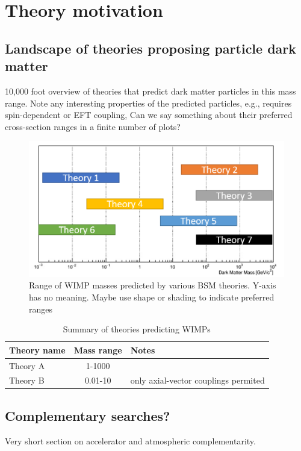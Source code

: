 \section{Theory motivation}
\label{sec:theory}

\subsection{Landscape of theories proposing particle dark matter}
10,000 foot overview of theories that predict dark matter particles in this mass range. Note any interesting properties of the predicted particles, e.g., requires spin-dependent or EFT coupling, Can we say something about their preferred cross-section ranges in a finite number of plots?

\begin{figure}
    \centering
    \includegraphics{figures/theory_landscape_cartoon.png}
    \caption{Range of WIMP masses predicted by various BSM theories. Y-axis has no meaning. Maybe use shape or shading to indicate preferred ranges}
    \label{fig:theor_wimp_masses}
\end{figure}

\begin{table}
    \centering
    \begin{tabular}{lcl}
    Theory name & Mass range & Notes \\ \hline
    Theory A & 1-1000 & \\
    Theory B & 0.01-10 &  only axial-vector couplings permited \\
    \end{tabular}
    \caption{Summary of theories predicting WIMPs}
    \label{tab:my_label}
\end{table}

\subsection{Complementary searches?}
Very short section on accelerator and atmospheric complementarity.